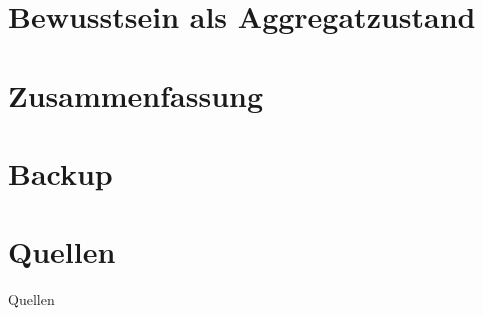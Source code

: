 	\section{Bewusstsein als Aggregatzustand}
		\separatorslide
		
		
		
		
		
		
		
		
		
		
		
		
	
	\section{Zusammenfassung}
		\separatorslide
	
	
	\section*{Backup}
	\separatorslide	
	
	
	\section*{Quellen}
	\separatorslide
	
	\nocite{Zeh_00}
	\begin{frame}[allowframebreaks]{Quellen}
		\printbibliography
	\end{frame}

